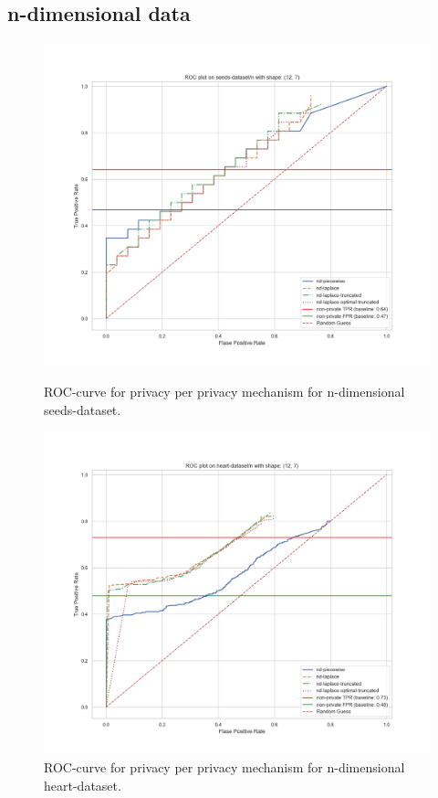 \subsection{n-dimensional data}
\begin{figure}[H]
    \centering
    \begin{minipage}[c]{0.49\textwidth}
        \includegraphics[width=1\textwidth]{Results/RQ2-nd/seeds-dataset/roc_plot.png}
        \caption{ROC-curve for privacy per privacy mechanism for n-dimensional seeds-dataset.}
        \label{fig:privacy_seeds-dataset_comparison_nd_roc_plot}
    \end{minipage}
    \begin{minipage}[c]{0.49\textwidth}
        \includegraphics[width=1\textwidth]{Results/RQ2-nd/heart-dataset/roc_plot.png}
        \caption{ROC-curve for privacy per privacy mechanism for n-dimensional heart-dataset.}
        \label{fig:privacy_heart-dataset_comparison_nd_roc_plot}
    \end{minipage}
\end{figure}


